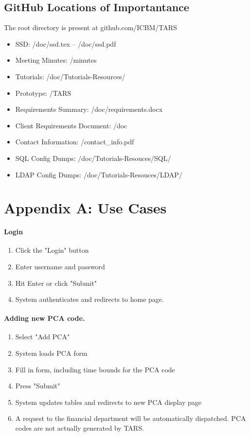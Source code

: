 \documentclass[letterpaper]{article}
\begin{document}
\subsection{GitHub Locations of Importantance}
The root directory is present at github.com/ICBM/TARS
\begin{itemize}
  \item SSD: /doc/ssd.tex -- /doc/ssd.pdf
  \item Meeting Minutes: /minutes
  \item Tutorials: /doc/Tutorials-Resources/
  \item Prototype: /TARS
  \item Requirements Summary: /doc/requirements.docx
  \item Client Requirements Document: /doc
  \item Contact Information: /contact\_info.pdf
  \item SQL Config Dumps: /doc/Tutorials-Resouces/SQL/
  \item LDAP Config Dumps: /doc/Tutorials-Resouces/LDAP/
\end{itemize}


\section{Appendix A: Use Cases} 
\paragraph{Login}
\begin{enumerate}
\item Click the "Login" button
\item Enter username and password
\item Hit Enter or click "Submit"
\item System authenticates and redirects to home page.
\end{enumerate}

\paragraph{Adding new PCA code.}
\begin{enumerate}
\item Select "Add PCA"
\item System loads PCA form
\item Fill in form, including time bounds for the PCA code
\item Press "Submit"
\item System updates tables and redirects to new PCA display page
\item A request to the financial department will be automatically dispatched. PCA codes are not actually generated by TARS.
\end{enumerate}
\end{document}
